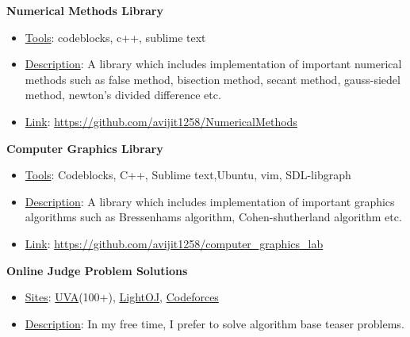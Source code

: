 \documentclass[margin]{res}
\begin{document}
\begin{resume}
\begin{itemize}
     \end{itemize}

     {\bf Numerical Methods Library}   
                 \begin{itemize} \itemsep -2pt

                \item \underline{Tools}:  codeblocks, c++, sublime text   
                 
                \item  \underline{Description}:  A library which includes implementation of important numerical methods such as false method, bisection method, secant method, gauss-siedel method, newton's divided difference etc.

                \item \underline{Link}:  \url{https://github.com/avijit1258/NumericalMethods}

     \end{itemize}

     {\bf Computer Graphics Library}   
                 \begin{itemize} \itemsep -2pt

                \item \underline{Tools}:  Codeblocks, C++, Sublime text,Ubuntu, vim, SDL-libgraph  
                 
                \item  \underline{Description}:  A library which includes implementation of important graphics algorithms such as Bressenhams algorithm, Cohen-shutherland algorithm etc.

                \item \underline{Link}:  \url{https://github.com/avijit1258/computer_graphics_lab}


     \end{itemize}

      {\bf Online Judge Problem Solutions}   
                 \begin{itemize} \itemsep -2pt

                \item \underline{Sites}:  \href{https://uhunt.onlinejudge.org/id/586034}{UVA}(100+), \href{http://lightoj.com/volume_userstat.php?user_id=16115}{LightOJ}, \href{http://codeforces.com/profile/avijit1258}{Codeforces}   
                 
                \item  \underline{Description}: In my free time, I prefer to solve algorithm base teaser problems.


\end{itemize}
\end{resume}
\end{document}
